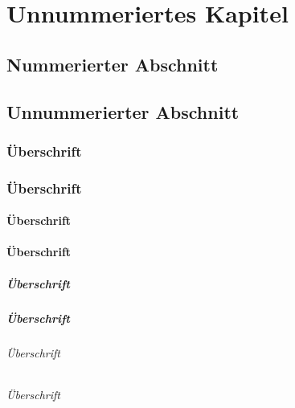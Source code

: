\documentclass[ngerman,%
cd=full,%
a3paper,%
tudscrver=2.05,%
chapterprefix=true,
]{tudscrreprt}
\begin{document}
\chapter*{Unnummeriertes Kapitel}
\setchapterpreamble{\blindtext}
\blindtext
\setchapterpreamble{\begin{center}\blindtext\end{center}}
\blindtext

\meaning\endtrivlist

\section{Nummerierter Abschnitt}
\section*{Unnummerierter Abschnitt}

\subsection{Überschrift}
\subsection*{Überschrift}
\subsubsection{Überschrift}
\subsubsection*{Überschrift}
\paragraph{Überschrift}
\paragraph*{Überschrift}
\subparagraph{Überschrift}
\subparagraph*{Überschrift}
\end{document}
